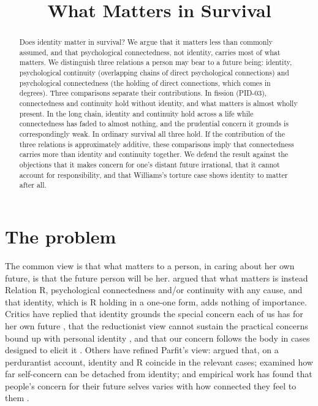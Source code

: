 \documentclass{situationist-preprint}
\title{What Matters in Survival}
\begin{document}
\maketitle

\begin{abstract}
Does identity matter in survival? We argue that it matters less than commonly assumed, and that psychological connectedness, not identity, carries most of what matters. We distinguish three relations a person may bear to a future being: identity, psychological continuity (overlapping chains of direct psychological connections) and psychological connectedness (the holding of direct connections, which comes in degrees). Three comparisons separate their contributions. In fission (PID-03), connectedness and continuity hold without identity, and what matters is almost wholly present. In the long chain, identity and continuity hold across a life while connectedness has faded to almost nothing, and the prudential concern it grounds is correspondingly weak. In ordinary survival all three hold. If the contribution of the three relations is approximately additive, these comparisons imply that connectedness carries more than identity and continuity together. We defend the result against the objections that it makes concern for one's distant future irrational, that it cannot account for responsibility, and that Williams's torture case shows identity to matter after all.
\end{abstract}

\section{The problem}

The common view is that what matters to a person, in caring about her own future, is that the future person will be her. \citet{Parfit1971,Parfit1984} argued that what matters is instead Relation R, psychological connectedness and/or continuity with any cause, and that identity, which is R holding in a one-one form, adds nothing of importance. Critics have replied that identity grounds the special concern each of us has for her own future \citep{Johnston1997}, that the reductionist view cannot sustain the practical concerns bound up with personal identity \citep{Schechtman1996}, and that our concern follows the body in cases designed to elicit it \citep{Williams1970}. Others have refined Parfit's view: \citet{Lewis1976} argued that, on a perdurantist account, identity and R coincide in the relevant cases; \citet{Martin1998} examined how far self-concern can be detached from identity; and empirical work has found that people's concern for their future selves varies with how connected they feel to them \citep{BartelsUrminsky2011}.
\end{document}
